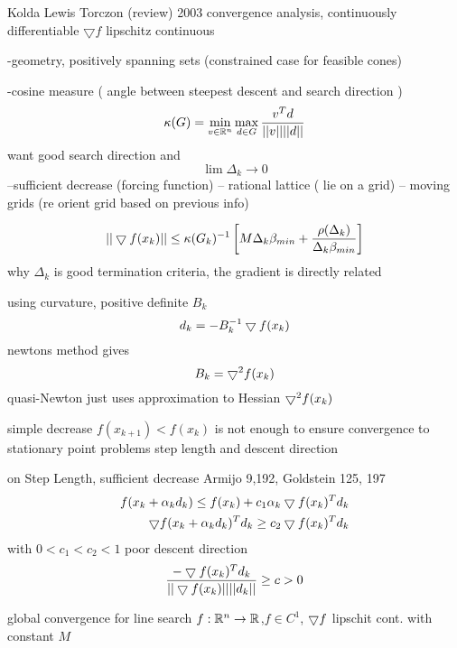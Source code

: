 Kolda Lewis Torczon (review) 2003
convergence analysis, continuously differentiable
$\bigtriangledown f$ lipschitz continuous

-geometry, positively spanning sets
(constrained case for feasible cones)

-cosine measure ( angle between steepest descent and search direction )
\begin{equation}
\kappa (G) = \min_{v \in \mathbb{R}^{n}}   \max_{d \in G}   \frac{v^T d}{||v|| ||d||}
\end{equation}
want good search direction and
\begin{equation}
\lim \Delta_k \rightarrow 0
\end{equation}
--sufficient decrease (forcing function)
-- rational lattice ( lie on a grid)
-- moving grids (re orient grid based on previous info)

\begin{equation}
|| \bigtriangledown f (x_k) || \le \kappa (G_k)^{-1} \left[ M \Delta_k \beta_{min} + \frac{\rho (\Delta_k)}{\Delta_k \beta_{min}}\right]
\end{equation}
why $\Delta_k$ is good termination criteria, the gradient is directly related

using curvature, positive definite $B_k$
\begin{equation}
d_k = - B_k^{-1} \bigtriangledown f (x_k)
\end{equation}
newtons method gives
\begin{equation}
B_k = \bigtriangledown^2 f(x_k)
\end{equation}
quasi-Newton just uses approximation to Hessian $\bigtriangledown^2 f(x_k)$

simple decrease $f (x_{k+1} ) < f(x_k)$ is not enough to ensure convergence to stationary point
problems step length and descent direction

on Step Length, sufficient decrease Armijo 9,192, Goldstein 125, 197
\begin{align}
f(x_k + \alpha_k d_k) \le f(x_k) + c_1 \alpha_k \bigtriangledown f(x_k)^T d_k  \label{step_length_1}\\
\bigtriangledown f (x_k + \alpha_k d_k)^T d_k \ge c_2 \bigtriangledown f(x_k)^T d_k \label{step_length_2}
\end{align}
with $0 < c_1 < c_2 < 1$
poor descent direction
\begin{equation}\label{descent_direction}
\frac{-\bigtriangledown f(x_k)^T d_k}{|| \bigtriangledown f (x_k) || ||d_k|| } \ge c > 0
\end{equation}


global convergence for line search
$f: \mathbb{R}^{n} \rightarrow \mathbb{R}^{}$,$f \in C^1$, $\bigtriangledown f$ lipschit cont. with constant $M$

